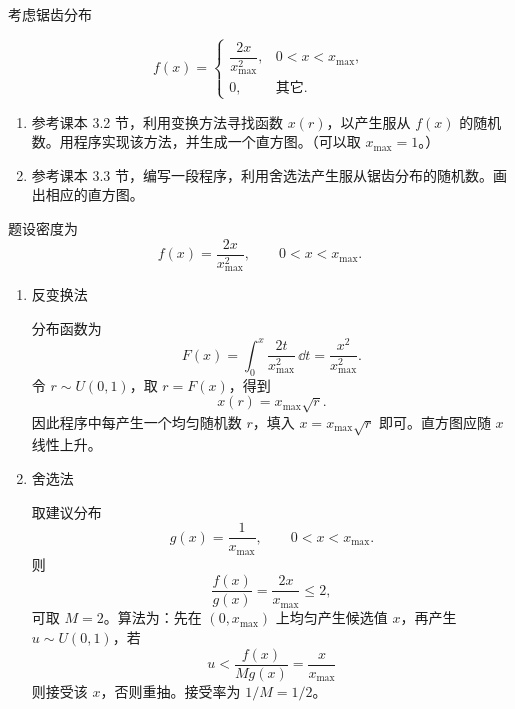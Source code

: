 \begin{question}
考虑锯齿分布

\[
f(x)=\begin{cases}
\dfrac{2x}{x_{\max}^2}, & 0<x<x_{\max},\\
0, & \text{其它}.
\end{cases}
\]

\begin{enumerate}
\item
  参考课本 3.2 节，利用变换方法寻找函数 \(x(r)\)，以产生服从 \(f(x)\)
  的随机数。用程序实现该方法，并生成一个直方图。（可以取
  \(x_{\max}=1\)。）
\item
  参考课本 3.3
  节，编写一段程序，利用舍选法产生服从锯齿分布的随机数。画出相应的直方图。
\end{enumerate}
\begin{solution}
题设密度为
\[
f(x)=\frac{2x}{x_{\max}^2},\qquad 0<x<x_{\max}.
\]

\begin{enumerate}
\item 反变换法

分布函数为
\[
F(x)=\int_0^x\frac{2t}{x_{\max}^2}\,\dd{t}=\frac{x^2}{x_{\max}^2}.
\]
令 \(r\sim U(0,1)\)，取 \(r=F(x)\)，得到
\[
x(r)=x_{\max}\sqrt r.
\]
因此程序中每产生一个均匀随机数 \(r\)，填入
\(x=x_{\max}\sqrt r\) 即可。直方图应随 \(x\) 线性上升。

\item 舍选法

取建议分布
\[
g(x)=\frac1{x_{\max}},\qquad 0<x<x_{\max}.
\]
则
\[
\frac{f(x)}{g(x)}=\frac{2x}{x_{\max}}\le 2,
\]
可取 \(M=2\)。算法为：先在 \((0,x_{\max})\) 上均匀产生候选值
\(x\)，再产生 \(u\sim U(0,1)\)，若
\[
u<\frac{f(x)}{Mg(x)}=\frac{x}{x_{\max}}
\]
则接受该 \(x\)，否则重抽。接受率为 \(1/M=1/2\)。
\end{enumerate}
\end{solution}
\end{question}


